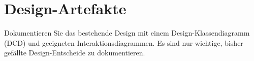 \section{Design-Artefakte}
Dokumentieren Sie das bestehende Design mit einem Design-Klassendiagramm (DCD) und 
geeigneten Interaktionsdiagrammen. Es sind nur wichtige, bisher gefällte Design-Entscheide zu 
dokumentieren. 